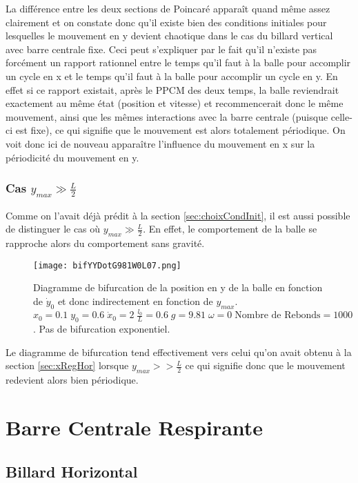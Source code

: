 \documentclass[a4paper]{report}
\begin{document}
La différence entre les deux sections de Poincaré apparaît quand même assez clairement et on constate donc qu'il existe bien des conditions initiales pour lesquelles le mouvement en y devient chaotique dans le cas du billard vertical avec barre centrale fixe. Ceci peut s'expliquer par le fait qu'il n'existe pas forcément un rapport rationnel entre le temps qu'il faut à la balle pour accomplir un cycle en x et le temps qu'il faut à la balle pour accomplir un cycle en y. En effet si ce rapport existait, après le PPCM des deux temps, la balle reviendrait exactement au même état (position et vitesse) et recommencerait donc le même mouvement, ainsi que les mêmes interactions avec la barre centrale (puisque celle-ci est fixe), ce qui signifie que le mouvement est alors totalement périodique. On voit donc ici de nouveau apparaître l'influence du mouvement en x sur la périodicité du mouvement en y.

\subsection{Cas $ y_{max} \gg \frac{L}{2} $}

Comme on l'avait déjà prédit à la section \ref{sec:choixCondInit}, il est aussi possible de distinguer le cas où \(y_{max} \gg \frac{L}{2} \). En effet, le comportement de la balle se rapproche alors du comportement sans gravité.
\begin{figure}[h!]
   \texttt{[image: bifYYDotG981W0L07.png]}
      \caption[Diagramme de Bifurcation en y en fonction de \(y_{max}\): g=9.81 ]{Diagramme de bifurcation de la position en y de la balle en fonction de \( \dot{y}_0\) et donc indirectement en fonction de \( y_{max} \). \(x_0=0.1 \; y_0=0.6 \; \dot{x}_0=2 \; \frac{l_0}{L}=0.6 \; g=9.81 \; \omega=0 \; \text{Nombre de Rebonds}=1000\). Pas de bifurcation exponentiel.}
\end{figure}
Le diagramme de bifurcation tend effectivement vers celui qu'on avait obtenu à la section \ref{sec:xRegHor} lorsque \(y_{max}>>\frac{L}{2}\) ce qui signifie donc que le mouvement redevient alors bien périodique.


\chapter{Barre Centrale Respirante}

\section{Billard Horizontal}
\end{document}
